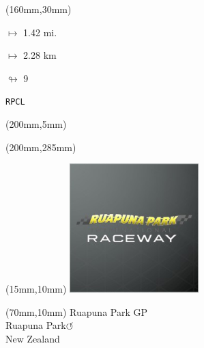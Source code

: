 \begin{textblock*}{40mm}(160mm,30mm)%
\Large
\par$\mapsto$ 1.42 mi.
\par$\mapsto$ 2.28 km
\par$\looparrowright$ 9
\par\hfill\tiny\tt RPCL\\
\end{textblock*}
\begin{textblock*}{20mm}(200mm,5mm)%
\fbox{\thepage}
\label{RPCL}
\end{textblock*}
\begin{textblock*}{20mm}(200mm,285mm)%
\fbox{\thepage}
\end{textblock*}

\null\newpage
\begin{textblock*}{50mm}(15mm,10mm)%
\includegraphics[width=50mm]{LG/RUPU.png}
\end{textblock*}
\begin{textblock*}{130mm}(70mm,10mm)%
{\fontsize{20}{20}\selectfont Ruapuna Park GP\\}
{\fontsize{16}{16}\selectfont Ruapuna Park\hfill \Large$\circlearrowleft$\\}
{\fontsize{12}{12}\selectfont New Zealand\\}
\end{textblock*}
